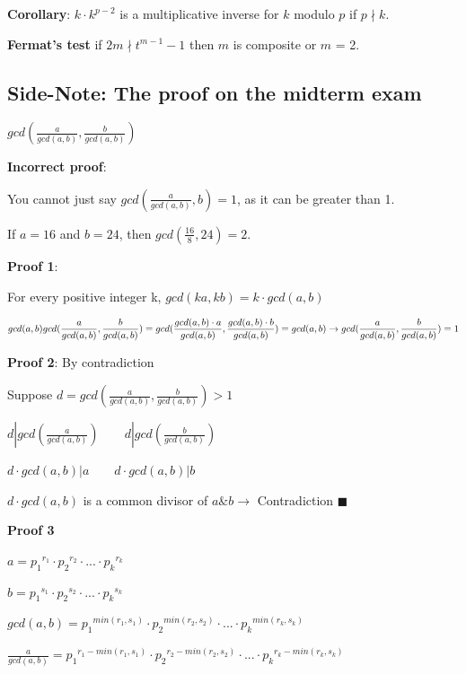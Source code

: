 \documentclass[9pt, letterpaper, oneside]{article}
\begin{document}
\textbf{Corollary}: $k \cdot k^{p-2}$ is a multiplicative inverse for $k$ modulo $p$ if $p \nmid k$.

\textbf{Fermat's test} if $2m \nmid t^{m-1} -1$ then $m$ is composite or $m$ = 2.


\subsection{Side-Note: The proof on the midterm exam}

$\displaystyle gcd\left(\frac{a}{gcd(a,b)}, \frac{b}{gcd(a,b)}\right)$

\textbf{Incorrect proof}:

You cannot just say $\displaystyle gcd(\frac{a}{gcd(a,b)}, b) = 1$, as it can be greater than 1.

If $a = 16$ and $b = 24$, then $gcd(\frac{16}{8}, 24) = 2$.

\textbf{Proof 1}:

For every positive integer k, $\displaystyle gcd(ka, kb) = k \cdot gcd(a,b)$

$\displaystyle gcd(a,b) gcd(\frac{a}{gcd(a,b)}, \frac{b}{gcd(a,b)}) = gcd(\frac{gcd(a,b) \cdot a }{gcd(a,b)}, \frac{gcd(a,b) \cdot b }{gcd(a,b)}) = gcd(a,b)\\
\to gcd(\frac{a}{gcd(a,b)}, \frac{b}{gcd(a,b)}) = 1$

\textbf{Proof 2}: By contradiction

Suppose $d = \displaystyle gcd\left(\frac{a}{gcd(a,b)}, \frac{b}{gcd(a,b)}\right)> 1$

$\displaystyle d | gcd\left(\frac{a}{gcd(a,b)}\right) \qquad d|gcd\left(\frac{b}{gcd(a,b)}\right)$

$\displaystyle d \cdot gcd(a,b) | a \qquad d\cdot gcd(a,b) | b$

$\displaystyle d \cdot gcd(a,b)$ is a common divisor of $a \& b \to$ Contradiction $\blacksquare$

\textbf{Proof 3}

$a = {p_1}^{r_1} \cdot {p_2}^{r_2} \cdot ... \cdot {p_k}^{r_k}$

$b = {p_1}^{s_1} \cdot {p_2}^{s_2} \cdot ... \cdot {p_k}^{s_k}$

$\displaystyle gcd(a,b) = {p_1}^{min(r_1, s_1)} \cdot {p_2}^{min(r_2, s_2)} \cdot ... \cdot {p_k}^{min(r_k, s_k)}$

$\displaystyle \frac{a}{gcd(a,b)} = {p_1}^{r_1 - min(r_1, s_1)} \cdot {p_2}^{r_2 - min(r_2, s_2)} \cdot ... \cdot {p_k}^{r_k - min(r_k, s_k)} $
\end{document}

